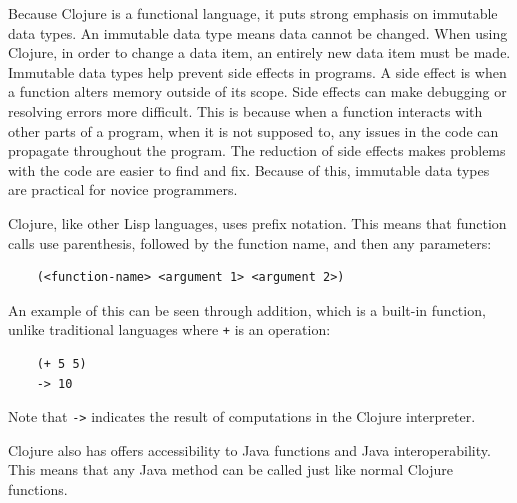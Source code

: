 \documentclass[12pt]{article}
\newcommand{\comment}[1]{{\bf \tt  {#1}}}
\newcommand{\emcomment}[1]{\textcolor{ForestGreen}{\comment{Elena: {#1}}}}
\newcommand{\hfcomment}[1]{\textcolor{Teal}{\comment{Henry: {#1}}}}
\begin{document}
Because Clojure is a functional language, it puts strong emphasis on
immutable data types. An immutable data type means data cannot 
be changed. When using Clojure, in order to change a data item, an entirely 
new data item must be made. Immutable data types help prevent side effects in programs. 
A side effect is when a function alters memory outside of its scope. Side effects can make 
debugging or resolving errors more
difficult. This is because when a function interacts with other parts of a program,
when it is not supposed to, any issues in the code can propagate throughout the program. The
reduction of side effects makes problems with the code are easier to find and fix.
Because of this, immutable data types are practical for novice programmers.
  
Clojure, like other Lisp languages, uses prefix notation. This means
that function calls use parenthesis, followed by the function name,
and then any parameters: 
\begin{verbatim}
	(<function-name> <argument 1> <argument 2>)
\end{verbatim}

An example of this can be seen through addition, which is a built-in function, unlike traditional
languages where \texttt{+} is an operation: %

\begin{verbatim}
	(+ 5 5)
	-> 10
\end{verbatim}

Note that \texttt{->} indicates the result of computations in the Clojure interpreter.

Clojure also has offers accessibility to Java functions and Java
interoperability. This means that any Java method can be called just
like normal Clojure functions.
\end{document}
